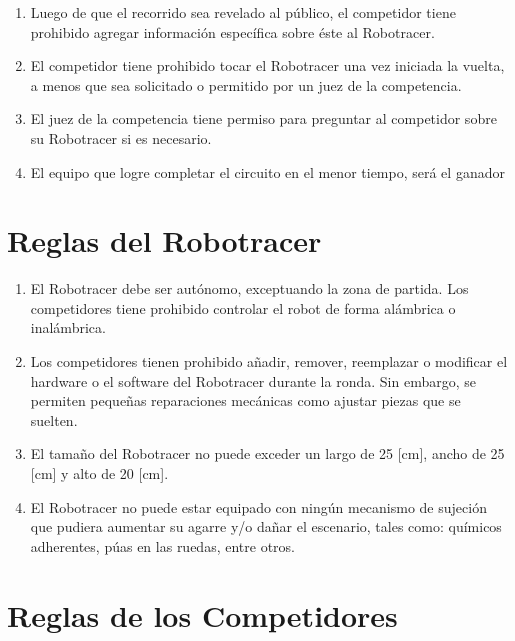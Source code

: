 \begin{enumerate}
  \item Luego de que el recorrido sea revelado al público, el competidor tiene prohibido agregar información específica sobre éste al Robotracer.

  \item El competidor tiene prohibido tocar el Robotracer una vez iniciada la vuelta, a menos que sea solicitado o permitido por un juez de la competencia.

  \item El juez de la competencia tiene permiso para preguntar al competidor sobre su Robotracer si es necesario.

  \item El equipo que logre completar el circuito en el menor tiempo, será el ganador
\end{enumerate}


\section{Reglas del Robotracer}

\begin{enumerate}
  \item El Robotracer debe ser autónomo, exceptuando la zona de partida. Los competidores tiene prohibido controlar el robot de forma alámbrica o inalámbrica.

  \item Los competidores tienen prohibido añadir, remover, reemplazar o modificar el hardware o el software del Robotracer durante la ronda. Sin embargo, se permiten pequeñas reparaciones mecánicas como ajustar piezas que se suelten.

  \item El tamaño del Robotracer no puede exceder un largo de 25 [cm], ancho de 25 [cm] y alto de 20 [cm].

  \item El Robotracer no puede estar equipado con ningún mecanismo de sujeción que pudiera aumentar su agarre y/o dañar el escenario, tales como: químicos adherentes, púas en las ruedas, entre otros.
\end{enumerate}

\section{Reglas de los Competidores}

